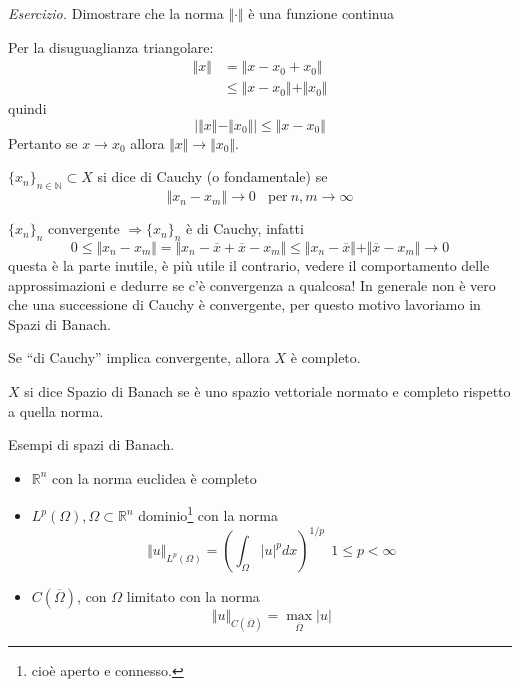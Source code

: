 \documentclass[10pt,a4paper,twoside,openright]{book}
\begin{document}
\textit{Esercizio.} Dimostrare che la norma $\Vert \cdotp \Vert $ è una funzione continua

Per la disuguaglianza triangolare:
\begin{align*}
	\Vert x\Vert  & =\Vert x-x_{0} +x_{0}\Vert \\
 				& \leqslant \Vert x-x_{0}\Vert +\Vert x_{0}\Vert 
\end{align*}
quindi
\begin{equation*}
	\Big| \Vert x\Vert -\Vert x_{0}\Vert \Big|\leqslant \Vert x-x_{0}\Vert 
\end{equation*}
Pertanto se $x\rightarrow x_{0}$ allora $\Vert x\Vert \rightarrow \Vert x_{0}\Vert $.

\begin{definition}
	$\{x_{n}\}_{n\in \mathbb{N}} \subset X$ si dice di Cauchy (o fondamentale) se
	\begin{equation*}
		\Vert x_{n} -x_{m}\Vert \rightarrow 0\ \ \ \ \text{per} \ n,m\rightarrow \infty 
	\end{equation*}
\end{definition}
$\{x_{n}\}_{n}$ convergente $\Rightarrow \{x_{n}\}_{n}$ è di Cauchy, infatti
\begin{equation*}
	0\leqslant \Vert x_{n} -x_{m}\Vert =\Vert x_{n} -\overline{x} +\overline{x} -x_{m}\Vert \leqslant \Vert x_{n} -\overline{x}\Vert +\Vert \overline{x} -x_{m}\Vert \rightarrow 0
\end{equation*}
questa è la parte inutile, è più utile il contrario, vedere il comportamento delle approssimazioni e dedurre se c'è convergenza a qualcosa! In generale non è vero che una successione di Cauchy è convergente, per questo motivo lavoriamo in Spazi di Banach.
\begin{definition}
	Se ``di Cauchy'' implica convergente, allora $X$ è completo.
\end{definition}
\begin{definition}
	$X$ si dice Spazio di Banach se è uno spazio vettoriale normato e completo rispetto a quella norma.
\end{definition}
Esempi di spazi di Banach.
\begin{itemize}
	\item $\mathbb{R}^{n}$ con la norma euclidea è completo
	\item $L^{p}(\Omega),\Omega \subset \mathbb{R}^{n}$ dominio\footnote{cioè aperto e connesso.} con la norma\begin{equation*}
	      \Vert u\Vert _{L^{p}(\Omega)} =\left(\int _{\Omega }| u| ^{p} dx\right)^{1/p} \ \ 1\leqslant p< \infty 
	\end{equation*}
	\item $C(\overline{\Omega })$, con $\Omega $ limitato con la norma\begin{equation*}
	      \Vert u\Vert _{C(\overline{\Omega })} =\max_{\overline{\Omega }}| u| 
	\end{equation*}
\end{itemize}
\end{document}
